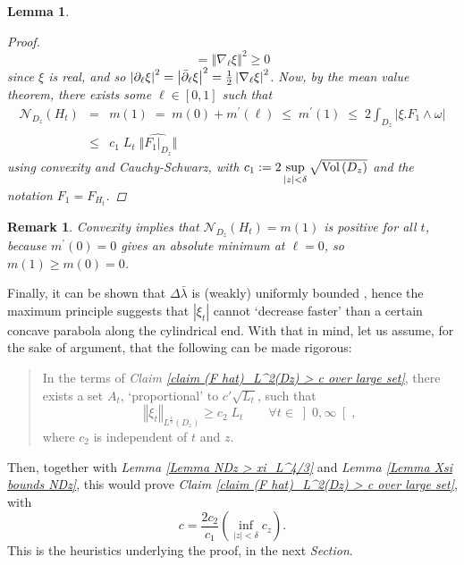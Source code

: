 \documentclass{article}
\newcommand{\func}[1]{\textnormal {#1\,}}
\newtheorem{lemma}[theorem]{Lemma}
\newtheorem{remark}[theorem]{Remark}
\begin{document}
\begin{lemma}
\begin{proof}
\begin{displaymath}
        =\left\Vert \nabla_{\ell }\xi \right\Vert ^{2} \geq 0
\end{displaymath}
since $\xi $ is real, and so $\left\vert \partial _{\ell }\xi
\right\vert ^{2}=\left\vert \bar{\partial}_{\ell }\xi \right\vert ^{2}=\frac{%
1}{2}\left\vert \nabla _{\ell }\xi \right\vert ^{2}$. Now, by the mean value theorem, there exists some $\ell \in\left[ 0,1 \right]$ such that
\begin{eqnarray*}
        \mathcal{N}_{D_{z}}\left( H_{t}\right)
        &=&m\left( 1\right) \;=\; m(0) + m^{\prime }\left( \ell \right) 
        \;\leq\; m^{\prime}(1)
        \;\leq\; 2\int_{D_{z}}\left\vert \xi.F_{1}\wedge \omega \right\vert \\
        &\leq & c_{1}\;L_t \;\Vert \widehat{\left.F_{1}\right\vert_{D_z}}\Vert
\end{eqnarray*}%
using convexity and Cauchy-Schwarz, with $c_1:= 2\sup\limits_{\left\vert z \right\vert < \delta}\sqrt{\func{Vol}(D_z)}$ and the notation $F_1=F_{H_t}$.
\end{proof}
\end{lemma}
\begin{remark}          \label{rem N functional is convex}
Convexity implies that $\mathcal{N}_{D_{z}}\left( H_{t}\right) =m\left( 1\right) $ is \emph{positive} for all $t$, because $m^{\prime }\left( 0\right) =0$ gives an absolute minimum at $\ell =0$, so $m\left( 1\right) \geq m\left( 0\right) =0$.
\end{remark}
 
Finally, it can be shown that $\Delta\bar{\lambda}$ is (weakly) uniformly bounded \cite[p.246]{inf dets stab bdls...}, hence the maximum principle suggests that $\left\vert\xi_t\right\vert$ cannot `decrease faster' than a certain concave parabola along the cylindrical end. With that in mind, let us assume, for the sake of argument, that the following can be made rigorous:
\begin{quote}
In the terms of \emph{Claim \ref{claim (F hat)_L^2(Dz) > c  over large set}}, there exists a set $A_t$, `proportional' to $c'\sqrt{L_t}$, such that%
\begin{equation*}
        \left\Vert \xi_{t}\right\Vert _{L^{\frac{4}{3}}\left( D_{z}\right)}
        \geq c_{2} \; L_{t} \qquad \forall t\in\left]0,\infty\right[,
\end{equation*}
where $c_2$ is independent of $t$ and $z$.
\end{quote}
Then, together with \emph{Lemma \ref{Lemma NDz > xi_L^4/3}} and \emph{Lemma \ref{Lemma Xsi bounds NDz}}, this would prove \emph{Claim \ref{claim (F hat)_L^2(Dz) > c  over large set}}, with%
\begin{equation*}
c=\frac{2c_2}{c_1}\left(\inf_{\left\vert z \right\vert<\delta}{c_{z}}\right).
\end{equation*}
This is the heuristics underlying the proof, in the next \emph{Section}.
\end{document}
